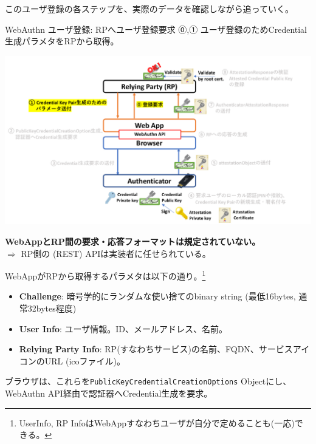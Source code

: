 \documentclass[12pt,dvipdfmx,uplatex]{beamer}
\begin{document}
\begin{frame}
このユーザ登録の各ステップを、実際のデータを確認しながら追っていく。
\end{frame}

\begin{frame}{WebAuthn ユーザ登録: RPへユーザ登録要求}
⓪,① ユーザ登録のためCredential生成パラメタをRPから取得。
\begin{center}
\includegraphics[width=0.9\linewidth]{Figs/webauthn-registration1.pdf}
\end{center}
\textbf{WebAppとRP間の要求・応答フォーマットは規定されていない。}\\
$\Rightarrow$ RP側の (REST) APIは実装者に任せられている。
\end{frame}

\begin{frame}
WebAppがRPから取得するパラメタは以下の通り。\footnote[frame]{\scriptsize UserInfo, RP InfoはWebAppすなわちユーザが自分で定めることも(一応)できる。}
\begin{itemize}
 \item \textbf{Challenge}: \alert{暗号学的にランダムな使い捨てのbinary string (最低16bytes, 通常32bytes程度)}
 \item \textbf{User Info}: ユーザ情報。ID、メールアドレス、名前。
 \item \textbf{Relying Party Info}: RP(すなわちサービス)の名前、FQDN、サービスアイコンのURL (icoファイル)。
\end{itemize}

\vspace{2ex}
ブラウザは、これらを\texttt{PublicKeyCredentialCreationOptions} Objectにし、WebAuthn API経由で認証器へCredential生成を要求。

\end{frame}
\end{document}

